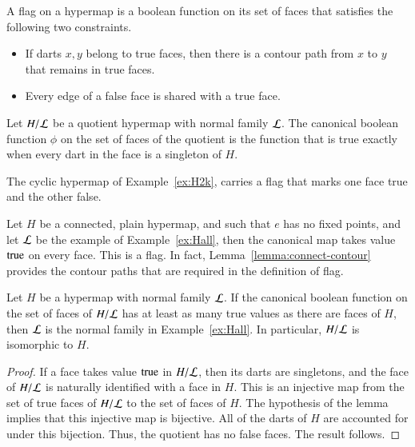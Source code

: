 \begin{definition}[flag]  A flag on a hypermap
is a boolean function on its set of faces 
that satisfies the following two
constraints.
\begin{itemize}
    \item If darts $x,y$ belong to true faces,
    then there is a contour path from $x$ to $y$ that remains
    in true faces.
    \item Every edge of a false face is shared with a true face.
    \end{itemize}
\end{definition}

\begin{example} Let $H/{\cal L}$ be a quotient hypermap with
normal family $\cal L$.  The canonical boolean function
$\phi$ on the set of faces of the quotient is the function that
is true exactly when every dart in
the face is a singleton of $H$.
\end{example}

\begin{example} The cyclic hypermap of Example~\ref{ex:H2k}, 
carries a flag
that marks one face true and the other false.
\end{example}

\begin{example} Let 
$H$ be a connected, plain hypermap, and 
such that $e$ has no fixed points,
and let $\cal L$ be the example of Example~\ref{ex:Hall}, 
then the canonical
map takes value ${\operatorname{true}}$ on every face.  This is a flag.
In fact,
Lemma~\ref{lemma:connect-contour} provides the contour paths 
that are required in the definition of flag.
\end{example}

\begin{lemma}  
Let $H$ be a hypermap with normal family ${\cal L}$.
If the canonical boolean function on the set of faces of
$H/{\cal L}$ has at least as many
true values as there are faces of $H$, then $\cal L$ is the normal family
in Example~\ref{ex:Hall}. In particular, $H/{\cal L}$ is isomorphic to $H$.
\end{lemma}

\begin{proof}  If a face takes value ${\operatorname{true}}$ 
in $H/{\cal L}$, then its darts are
singletons, and the face of $H/{\cal L}$ is naturally identified with
 a face in $H$.  This is an injective map from the 
set of true faces of $H/{\cal L}$ to
the set of faces of $H$.  The hypothesis of the lemma implies that this
injective map is bijective.
All of the darts of $H$ are accounted for under this bijection.
Thus, the quotient has no
false faces.  The result follows.
\end{proof}


